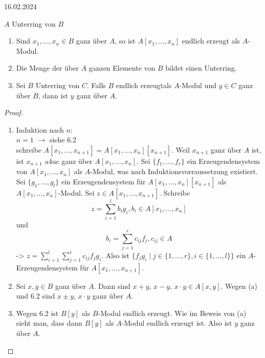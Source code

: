 \documentclass[../main.tex]{subfiles}
\begin{document}
\begin{flushright}
    16.02.2024
\end{flushright}
\begin{corollary}
    $A$ Unterring von $B$
    \begin{enumerate}[label=(\alph*)]
        \item Sind $x_1, \dots, x_n\in B$ ganz über $A$, so ist $A[x_1,\dots,x_n]$ endlich erzeugt als $A$-Modul.
        \item Die Menge der über $A$ ganzen Elemente von $B$ bildet einen Unterring.
        \item Sei $B$ Unterring von $C$. Falls $B$ endlich erzeugtals $A$-Modul und $y\in C$ ganz über $B$, dann ist $y$ ganz über $A$.
    \end{enumerate}
\end{corollary}
\begin{proof}
    \begin{enumerate}[label=(\alph*)]
        \item Induktion nach $n$:\\
        $n=1$ $\rightarrow$ siehe 6.2\\
        schreibe $A[x_1, \dots,x_{n+1}] = A[x_1,\dots,x_{n}][x_{n+1}]$.
        Weil $x_{n+1}$ ganz über $A$ ist, ist $x_{n+1}$ a4uc ganz über $A[x_1,\dots,x_n]$.
        Sei $\{f_1,\dots, f_r\}$ ein Erzeugendensystem von $A[x_1,\dots,x_n]$ als $A$-Modul, was nach Induktionsvorraussetzung existiert.
        Sei $\{g_1,\dots,g_l\}$ ein Erzeugendensystem für $A[x_1,\dots, x_n][x_{n+1}]$ als $A[x_1,\dots,x_n]$-Modul.
        Sei $z\in A[x_1,\dots,x_{n+1}]$. Schreibe $$z=\sum_{i=1}^l b_ig_i, b_i\in A[x_1,\dots,x_n]$$
        und $$b_i = \sum_{j=1}^r c_{ij} f_j, c_{ij}\in A$$
        -> $z=\sum_{i=1}^l\sum_{j=1}^r c_{ij} f_j g_i$. Also ist $\{f_j g_i\mid j\in \{1,\dots,r\}, i\in \{1,\dots,l\}\}$ ein $A$-Erzeugendensystem für $A[x_1,\dots,x_{n+1}]$.
        \item
        Sei $x,y\in B$ ganz über $A$.
        Dann sind $x+y$, $x-y$, $x\cdot y \in A[x,y]$.
        Wegen (a) und 6.2 sind $x\pm y$, $x\cdot y$ ganz über $A$.
        \item
        Wegen 6.2 ist $B[y]$ als $B$-Modul endlich erzeugt. Wie im Beweis von (a) sieht man, dass dann $B[y]$ als $A$-Modul endlich erzeugt ist. Also ist $y$ ganz über $A$.
    \end{enumerate}
\end{proof}
\end{document}
